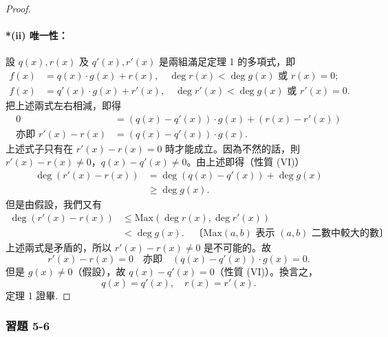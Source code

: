 \begin{proof}
\paragraph{*(ii) 唯一性：}
設 $q(x), r(x)$ 及 $q'(x), r'(x)$ 是兩組滿足定理 1 的多項式，即
\begin{align*}
  f(x) &= q(x) \cdot g(x) + r(x), \quad \deg r(x) < \deg g(x) \text{ 或 } r(x)=0; \\
  f(x) &= q'(x) \cdot g(x) + r'(x), \quad \deg r'(x) < \deg g(x) \text{ 或 } r'(x)=0.
\end{align*}
把上述兩式左右相減，即得
\begin{align*}
  0 &= (q(x)-q'(x)) \cdot g(x) + (r(x)-r'(x)) \\
  \text{亦即 } r'(x)-r(x) &= (q(x)-q'(x)) \cdot g(x).
\end{align*}
上述式子只有在 $r'(x)-r(x)=0$ 時才能成立。因為不然的話，則 $r'(x)-r(x) \neq 0$，$q(x)-q'(x) \neq 0$。由上述即得（性質 (VI)）
\begin{align*}
  \deg(r'(x)-r(x)) &= \deg(q(x)-q'(x)) + \deg g(x) \\
  &\ge \deg g(x).
\end{align*}
但是由假設，我們又有
\begin{align*}
  \deg(r'(x)-r(x)) &\le \text{Max}(\deg r(x), \deg r'(x)) \\
  &< \deg g(x). \quad \text{〔$\text{Max}(a,b)$ 表示 $(a,b)$ 二數中較大的數〕}
\end{align*}
上述兩式是矛盾的，所以 $r'(x)-r(x) \neq 0$ 是不可能的。故
\begin{equation*}
  r'(x)-r(x) = 0 \quad \text{亦即} \quad (q(x)-q'(x)) \cdot g(x) = 0.
\end{equation*}
但是 $g(x) \neq 0$（假設），故 $q(x)-q'(x)=0$（性質 (VI)）。換言之，
\begin{equation*}
  q(x)=q'(x), \quad r(x)=r'(x).
\end{equation*}
定理 1 證畢.
\end{proof}

\subsubsection*{習題 5-6}\label{sec:ex5-6}

